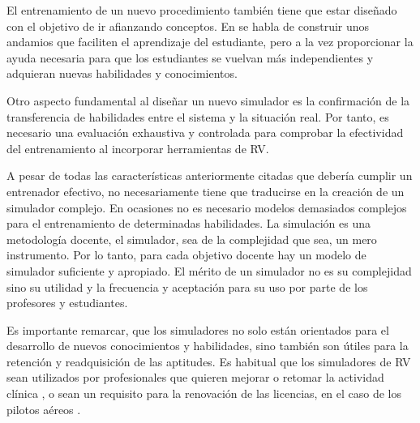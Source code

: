 El entrenamiento de un nuevo procedimiento también tiene que estar diseñado con el objetivo de ir afianzando conceptos. En \cite{olson2014jerome} se habla de construir unos andamios que faciliten el aprendizaje del estudiante, pero a la vez proporcionar la ayuda necesaria para que los estudiantes se vuelvan más independientes y adquieran nuevas habilidades y conocimientos.





Otro aspecto fundamental al diseñar un nuevo simulador es la confirmación de la transferencia de habilidades entre el sistema y la situación real. Por tanto, es necesario una evaluación exhaustiva y controlada para comprobar la efectividad del entrenamiento al incorporar herramientas de \ac{RV}\cite{AIM2016224}.

A pesar de todas las características anteriormente citadas que debería cumplir un entrenador efectivo, no necesariamente tiene que traducirse en la creación de un simulador complejo. En ocasiones no es necesario modelos demasiados complejos para el entrenamiento de determinadas habilidades. La simulación es una metodología docente, el simulador, sea de la complejidad que sea, un mero instrumento. Por lo tanto, para cada objetivo docente hay un modelo de simulador suficiente y apropiado. El mérito de un simulador no es su complejidad sino su utilidad y la frecuencia y aceptación para su uso por parte de los profesores y estudiantes.

Es importante remarcar, que los simuladores no solo están orientados para el desarrollo de nuevos conocimientos y habilidades, sino también son útiles para la retención y readquisición de las aptitudes. Es habitual que los simuladores de \ac{RV} sean utilizados por profesionales que quieren mejorar o retomar la actividad clínica \cite{Atesok}, o sean un requisito para la renovación de las licencias, en el caso de los pilotos aéreos \cite{normativa}. 

